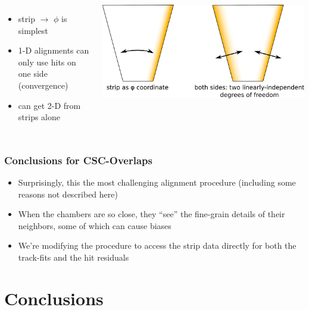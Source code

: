 \documentclass[compress]{beamer}
\begin{document}
\begin{frame}
\begin{columns}
\begin{itemize}
\item strip $\to$ $\phi$ is simplest
\item 1-D alignments can only use hits on one side (convergence)
\item can get 2-D from strips alone
\end{itemize}

\includegraphics[width=\linewidth]{revised_strategy.png}
\end{columns}
\end{frame}

\begin{frame}
\frametitle{Conclusions for CSC-Overlaps}
\begin{itemize}\setlength{\itemsep}{0.75 cm}
\item Surprisingly, this the most challenging alignment procedure
  (including some reasons not described here)
\item When the chambers are so close, they ``see'' the fine-grain
  details of their neighbors, some of which can cause biases
\item We're modifying the procedure to access the strip data directly
  for both the track-fits and the hit residuals
\end{itemize}
\end{frame}

\section*{Conclusions}
\end{document}
